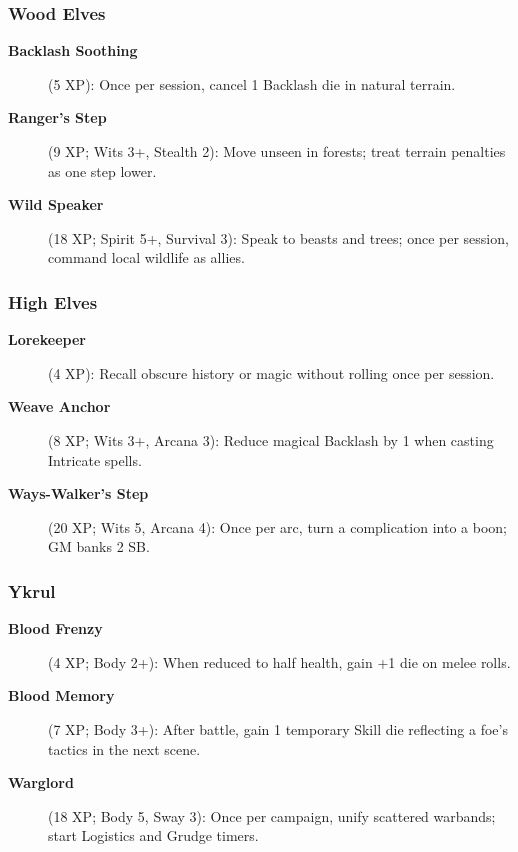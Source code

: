\subsubsection{Wood Elves}\label{subsubsec:wood_elf_talents}

\begin{description}
    \item[\textbf{Backlash Soothing}] (5 XP): Once per session, cancel 1 Backlash die in natural terrain.
    \item[\textbf{Ranger's Step}] (9 XP; Wits 3+, Stealth 2): Move unseen in forests; treat terrain penalties as one step lower.
    \item[\textbf{Wild Speaker}] (18 XP; Spirit 5+, Survival 3): Speak to beasts and trees; once per session, command local wildlife as allies.
\end{description}

\subsubsection{High Elves}\label{subsubsec:high_elf_talents}

\begin{description}
    \item[\textbf{Lorekeeper}] (4 XP): Recall obscure history or magic without rolling once per session.
    \item[\textbf{Weave Anchor}] (8 XP; Wits 3+, Arcana 3): Reduce magical Backlash by 1 when casting Intricate spells.
    \item[\textbf{Ways-Walker's Step}] (20 XP; Wits 5, Arcana 4): Once per arc, turn a complication into a boon; GM banks 2 SB.
\end{description}

\subsubsection{Ykrul}\label{subsubsec:ykrul_talents}

\begin{description}
    \item[\textbf{Blood Frenzy}] (4 XP; Body 2+): When reduced to half health, gain +1 die on melee rolls.
    \item[\textbf{Blood Memory}] (7 XP; Body 3+): After battle, gain 1 temporary Skill die reflecting a foe's tactics in the next scene.
    \item[\textbf{Warglord}] (18 XP; Body 5, Sway 3): Once per campaign, unify scattered warbands; start Logistics and Grudge timers.
\end{description}

